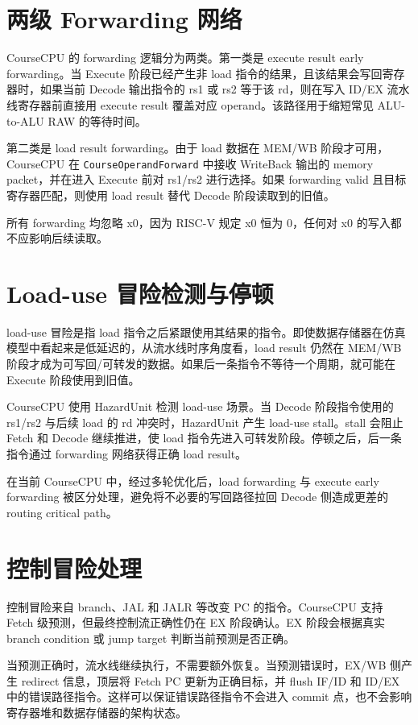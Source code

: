 \documentclass[UTF8,a4paper,12pt]{ctexrep}
\begin{document}
\section{两级 Forwarding 网络}

CourseCPU 的 forwarding 逻辑分为两类。第一类是 execute result early forwarding。当 Execute 阶段已经产生非 load 指令的结果，且该结果会写回寄存器时，如果当前 Decode 输出指令的 rs1 或 rs2 等于该 rd，则在写入 ID/EX 流水线寄存器前直接用 execute result 覆盖对应 operand。该路径用于缩短常见 ALU-to-ALU RAW 的等待时间。

第二类是 load result forwarding。由于 load 数据在 MEM/WB 阶段才可用，CourseCPU 在 \texttt{CourseOperandForward} 中接收 WriteBack 输出的 memory packet，并在进入 Execute 前对 rs1/rs2 进行选择。如果 forwarding valid 且目标寄存器匹配，则使用 load result 替代 Decode 阶段读取到的旧值。

所有 forwarding 均忽略 x0，因为 RISC-V 规定 x0 恒为 0，任何对 x0 的写入都不应影响后续读取。

\section{Load-use 冒险检测与停顿}

load-use 冒险是指 load 指令之后紧跟使用其结果的指令。即使数据存储器在仿真模型中看起来是低延迟的，从流水线时序角度看，load result 仍然在 MEM/WB 阶段才成为可写回/可转发的数据。如果后一条指令不等待一个周期，就可能在 Execute 阶段使用到旧值。

CourseCPU 使用 HazardUnit 检测 load-use 场景。当 Decode 阶段指令使用的 rs1/rs2 与后续 load 的 rd 冲突时，HazardUnit 产生 load-use stall。stall 会阻止 Fetch 和 Decode 继续推进，使 load 指令先进入可转发阶段。停顿之后，后一条指令通过 forwarding 网络获得正确 load result。

在当前 CourseCPU 中，经过多轮优化后，load forwarding 与 execute early forwarding 被区分处理，避免将不必要的写回路径拉回 Decode 侧造成更差的 routing critical path。

\section{控制冒险处理}

控制冒险来自 branch、JAL 和 JALR 等改变 PC 的指令。CourseCPU 支持 Fetch 级预测，但最终控制流正确性仍在 EX 阶段确认。EX 阶段会根据真实 branch condition 或 jump target 判断当前预测是否正确。

当预测正确时，流水线继续执行，不需要额外恢复。当预测错误时，EX/WB 侧产生 redirect 信息，顶层将 Fetch PC 更新为正确目标，并 flush IF/ID 和 ID/EX 中的错误路径指令。这样可以保证错误路径指令不会进入 commit 点，也不会影响寄存器堆和数据存储器的架构状态。
\end{document}
